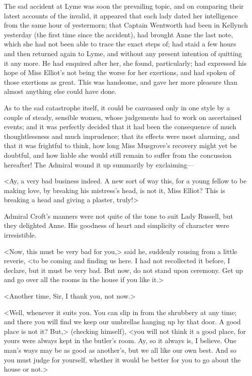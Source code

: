 The sad accident at Lyme was soon the prevailing topic, and on comparing their latest accounts of the invalid, it appeared that each lady dated her intelligence from the same hour of yestermorn; that Captain Wentworth had been in Kellynch yesterday (the first time since the accident), had brought Anne the last note, which she had not been able to trace the exact steps of; had staid a few hours and then returned again to Lyme, and without any present intention of quitting it any more. He had enquired after her, she found, particularly; had expressed his hope of Miss Elliot's not being the worse for her exertions, and had spoken of those exertions as great. This was handsome, and gave her more pleasure than almost anything else could have done.

As to the sad catastrophe itself, it could be canvassed only in one style by a couple of steady, sensible women, whose judgements had to work on ascertained events; and it was perfectly decided that it had been the consequence of much thoughtlessness and much imprudence; that its effects were most alarming, and that it was frightful to think, how long Miss Musgrove's recovery might yet be doubtful, and how liable she would still remain to suffer from the concussion hereafter! The Admiral wound it up summarily by exclaiming—

<Ay, a very bad business indeed. A new sort of way this, for a young fellow to be making love, by breaking his mistress's head, is not it, Miss Elliot? This is breaking a head and giving a plaster, truly!>

Admiral Croft's manners were not quite of the tone to suit Lady Russell, but they delighted Anne. His goodness of heart and simplicity of character were irresistible.

<Now, this must be very bad for you,> said he, suddenly rousing from a little reverie, <to be coming and finding us here. I had not recollected it before, I declare, but it must be very bad. But now, do not stand upon ceremony. Get up and go over all the rooms in the house if you like it.>

<Another time, Sir, I thank you, not now.>

<Well, whenever it suits you. You can slip in from the shrubbery at any time; and there you will find we keep our umbrellas hanging up by that door. A good place is not it? But,> (checking himself), <you will not think it a good place, for yours were always kept in the butler's room. Ay, so it always is, I believe. One man's ways may be as good as another's, but we all like our own best. And so you must judge for yourself, whether it would be better for you to go about the house or not.>

